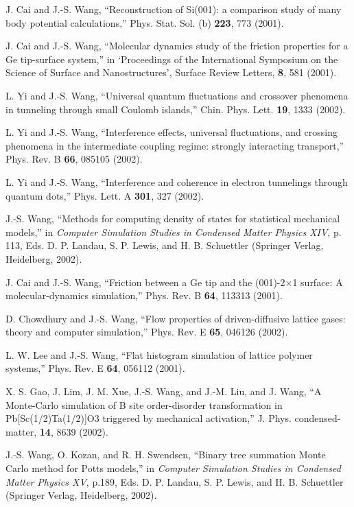 \itm J. Cai and J.-S. Wang, ``Reconstruction of Si(001):
a comparison study of many body potential calculations,''
Phys. Stat. Sol. (b) {\bf 223}, 773 (2001).

\itm J. Cai and J.-S. Wang, ``Molecular dynamics study of the 
friction properties for a Ge tip-surface system,'' in
`Proceedings of the International Symposium on the Science of
Surface and Nanostructures', Surface Review Letters, {\bf 8}, 581 (2001).

\itm L. Yi and J.-S. Wang, ``Universal quantum fluctuations and crossover 
phenomena in tunneling through small Coulomb islands,''
Chin. Phys. Lett. {\bf 19}, 1333 (2002).

\itm L. Yi and J.-S. Wang, ``Interference effects, universal fluctuations,
and crossing phenomena in the intermediate coupling regime: strongly
interacting transport,''  Phys. Rev. B {\bf 66}, 085105 (2002).

\itm L. Yi and J.-S. Wang, ``Interference and coherence in electron
tunnelings through quantum dots,'' Phys. Lett. A {\bf 301}, 327 (2002).

\itm J.-S. Wang, ``Methods for computing density of states for statistical 
mechanical models,''
in {\sl Computer Simulation Studies in Condensed Matter Physics XIV},
p. 113,
Eds. D. P. Landau, S. P. Lewis, and H. B. Schuettler (Springer Verlag,
Heidelberg, 2002).

\itm J. Cai and  J.-S. Wang, ``Friction between a Ge tip and the (001)-2$\times$1
surface: A molecular-dynamics simulation,'' Phys. Rev. B {\bf 64}, 113313 
(2001).

\itm D. Chowdhury and J.-S. Wang, ``Flow properties of driven-diffusive
lattice gases: theory and computer simulation,'' Phys. Rev. E {\bf 65}, 
046126 (2002).

\itm L. W. Lee and J.-S. Wang, ``Flat histogram simulation of lattice
polymer systems,'' Phys. Rev. E {\bf 64}, 056112 (2001).

\itm X. S. Gao, J. Lim, J. M. Xue, J.-S. Wang, and J.-M. Liu, and J. Wang,
``A Monte-Carlo simulation of B site order-disorder transformation in
Pb[Sc(1/2)Ta(1/2)]O3 triggered by mechanical activation,'' 
J. Phys. condensed-matter, {\bf 14}, 8639 (2002).
 
\itm J.-S. Wang, O. Kozan, and R. H. Swendsen, 
``Binary tree summation Monte Carlo method for Potts models,'' 
in {\sl Computer Simulation Studies in Condensed Matter Physics XV},
p.189, Eds. D. P. Landau, S. P. Lewis, and H. B. Schuettler (Springer Verlag,
Heidelberg, 2002).

